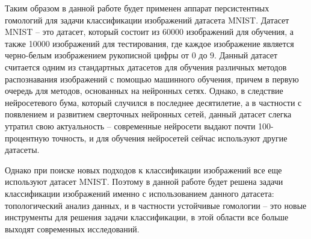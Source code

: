 Таким образом в данной работе будет применен аппарат персистентных гомологий для задачи классификации изображений датасета MNIST. Датасет MNIST -- это датасет, который состоит из 60000 изображений для обучения, а также 10000 изображений для тестирования, где каждое изображение является черно-белым изображением рукописной цифры от $0$ до $9$. Данный датасет считается одним из стандартных датасетов для обучения различных методов распознавания изображений с помощью машинного обучения, причем в первую очередь для методов, основанных на нейронных сетях. Однако, в следствие нейросетевого бума, который случился в последнее десятилетие, а в частности с появлением и развитием сверточных нейронных сетей, данный датасет слегка утратил свою актуальность -- современные нейросети выдают почти 100-процентную точность, и для обучения нейросетей сейчас используют другие датасеты. 

Однако при поиске новых подходов к классификации изображений все еще используют датасет MNIST. Поэтому в данной работе будет решена задачи классификации изображений именно с использованием данного датасета: топологический анализ данных, и в частности устойчивые гомологии -- это новые инструменты для решения задачи классификации, в этой области все больше выходят современных исследований.
